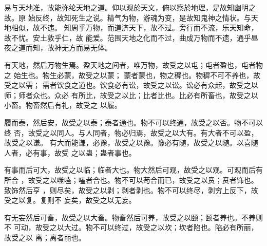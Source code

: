 {易与天地准，故能弥纶天地之道。仰以观於天文，俯以察於地理，是故知幽明之故。原
	始反终，故知死生之说。精气为物，游魂为变，是故知鬼神之情状。与天地相似，故不违。
	知周乎万物，而道济天下，故不过。旁行而不流，乐天知命，故不忧。安土敦乎仁，故
	能爱。范围天地之化而不过，曲成万物而不遗，通乎昼夜之道而知，故神无方而易无体。}

{有天地，然后万物生焉。盈天地之间者，唯万物，故受之以屯；屯者盈也，屯者物之
	始生也。物生必蒙，故受之以蒙； 蒙者蒙也，物之穉也。物穉不可不养也，故受之以需；
	需者饮食之道也。饮食必有讼，故受之以讼。讼必有众起，故受之以师；师者众也。众必
	有所比，故受之以比；比者比也。比必有所畜也，故受之以小畜。物畜然后有礼，故受之
	以履。}

{履而泰，然后安，故受之以泰；泰者通也。物不可以终通，故受之以否。物不可以终
	否，故受之以同人。与人同者，物必归焉，故受之以大有。有大者不可以盈，故受之以谦。
	有大而能谦，必豫，故受之以豫。豫必有随，故受之以随。以喜随人者，必有事，故受
	之以蛊；蛊者事也。}

{有事而后可大，故受之以临；临者大也。物大然后可观，故受之以观。可观而后有所合
	，故受之以噬嗑；嗑者合也。物不可以苟合而已，故受之以贲；贲者饰也。致饰然后亨
	，则尽矣，故受之以剥；剥者剥也。物不可以终尽，剥穷上反下，故受之以复。复则不
	妄矣，故受之以无妄。}

{有无妄然后可畜，故受之以大畜。物畜然后可养，故受之以颐；颐者养也。不养则不
	可动，故受之以大过。物不可以终过，故受之以坎；坎者陷也。陷必有所丽，故受之以
	离；离者丽也。}

